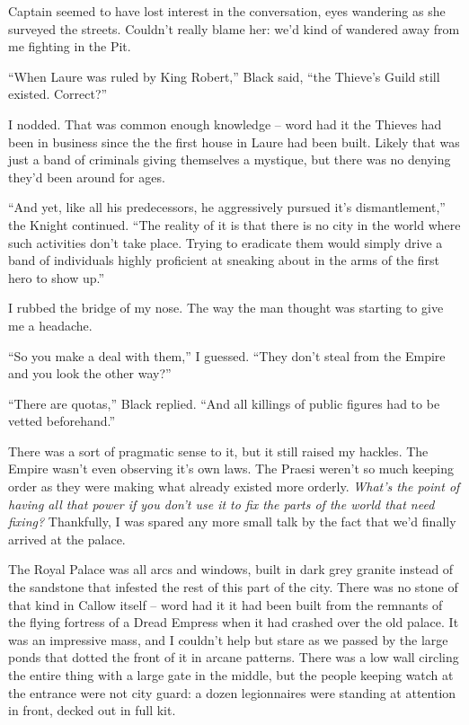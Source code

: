 \documentclass[12pt, openany]{book}
\begin{document}
Captain seemed to have lost interest in the conversation, eyes wandering as she surveyed the streets. Couldn’t really blame her: we’d kind of wandered away from me fighting in the Pit. 

“When Laure was ruled by King Robert,” Black said, “the Thieve’s Guild still existed. Correct?”

I nodded. That was common enough knowledge – word had it the Thieves had been in business since the the first house in Laure had been built. Likely that was just a band of criminals giving themselves a mystique, but there was no denying they’d been around for ages.

“And yet, like all his predecessors, he aggressively pursued it’s dismantlement,” the Knight continued. “The reality of it is that there is no city in the world where such activities don’t take place. Trying to eradicate them would simply drive a band of individuals highly proficient at sneaking about in the arms of the first hero to show up.”

I rubbed the bridge of my nose. The way the man thought was starting to give me a headache.

“So you make a deal with them,” I guessed. “They don’t steal from the Empire and you look the other way?”

“There are quotas,” Black replied. “And all killings of public figures had to be vetted beforehand.”

There was a sort of pragmatic sense to it, but it still raised my hackles. The Empire wasn’t even observing it’s own laws. The Praesi weren’t so much keeping order as they were making what already existed more orderly. \textit{What’s the point of having all that power if you don’t use it to fix the parts of the world that need fixing? }Thankfully, I was spared any more small talk by the fact that we’d finally arrived at the palace. 

The Royal Palace was all arcs and windows, built in dark grey granite instead of the sandstone that infested the rest of this part of the city. There was no stone of that kind in Callow itself – word had it it had been built from the remnants of the flying fortress of a Dread Empress when it had crashed over the old palace. It was an impressive mass, and I couldn’t help but stare as we passed by the large ponds that dotted the front of it in arcane patterns. There was a low wall circling the entire thing with a large gate in the middle, but the people keeping watch at the entrance were not city guard: a dozen legionnaires were standing at attention in front, decked out in full kit.
\end{document}
